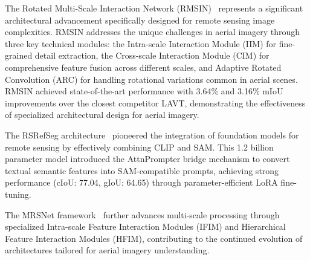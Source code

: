 The Rotated Multi-Scale Interaction Network (RMSIN)~\cite{liu2024rotated} represents a significant architectural advancement specifically designed for remote sensing image complexities. RMSIN addresses the unique challenges in aerial imagery through three key technical modules: the Intra-scale Interaction Module (IIM) for fine-grained detail extraction, the Cross-scale Interaction Module (CIM) for comprehensive feature fusion across different scales, and Adaptive Rotated Convolution (ARC) for handling rotational variations common in aerial scenes. RMSIN achieved state-of-the-art performance with 3.64\% and 3.16\% mIoU improvements over the closest competitor LAVT, demonstrating the effectiveness of specialized architectural design for aerial imagery.

The RSRefSeg architecture~\cite{chen2025rsrefseg} pioneered the integration of foundation models for remote sensing by effectively combining CLIP and SAM. This 1.2 billion parameter model introduced the AttnPrompter bridge mechanism to convert textual semantic features into SAM-compatible prompts, achieving strong performance (cIoU: 77.04, gIoU: 64.65) through parameter-efficient LoRA fine-tuning.

The MRSNet framework~\cite{yang2024large} further advances multi-scale processing through specialized Intra-scale Feature Interaction Modules (IFIM) and Hierarchical Feature Interaction Modules (HFIM), contributing to the continued evolution of architectures tailored for aerial imagery understanding.

